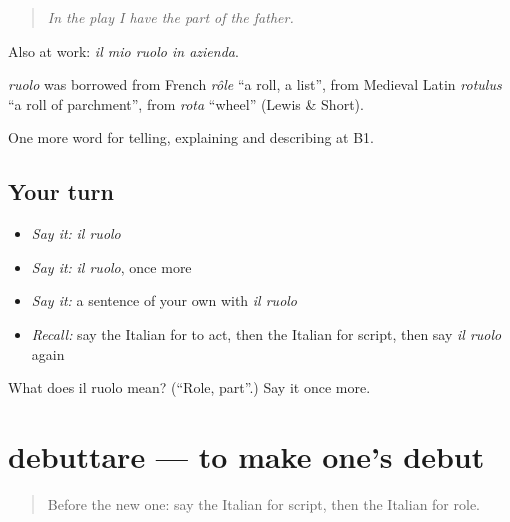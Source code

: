 \begin{quote}
\emph{In the play I have the part of the father.}
\end{quote}

Also at work: \emph{il mio ruolo in azienda}.

\begin{cousinweb}
\emph{ruolo} was borrowed from French \emph{rôle} \textquotedblleft{}a roll, a list\textquotedblright{}, from Medieval Latin \emph{rotulus} \textquotedblleft{}a roll of parchment\textquotedblright{}, from \emph{rota} \textquotedblleft{}wheel\textquotedblright{} (Lewis \& Short).
\end{cousinweb}

\begin{grammarlens}[title={What you've built}]
One more word for telling, explaining and describing at B1.
\end{grammarlens}

\subsection*{Your turn}
\begin{itemize}
\raggedright
  \item \emph{Say it:} \emph{il ruolo}
  \item \emph{Say it:} \emph{il ruolo}, once more
  \item \emph{Say it:} a sentence of your own with \emph{il ruolo}
  \item \emph{Recall:} say the Italian for to act, then the Italian for script, then say \emph{il ruolo} again
\end{itemize}

\begin{tcolorbox}[breakable,colback=teal!4,colframe=teal!35!black,title={Before you move on}]
What does il ruolo mean? (\textquotedblleft{}Role, part\textquotedblright{}.) Say it once more.
\end{tcolorbox}
\section[debuttare]{debuttare — to make one's debut}

\label{lesson:IT-C520-debuttare}



\begin{quote}
Before the new one: say the Italian for script, then the Italian for role.
\end{quote}

